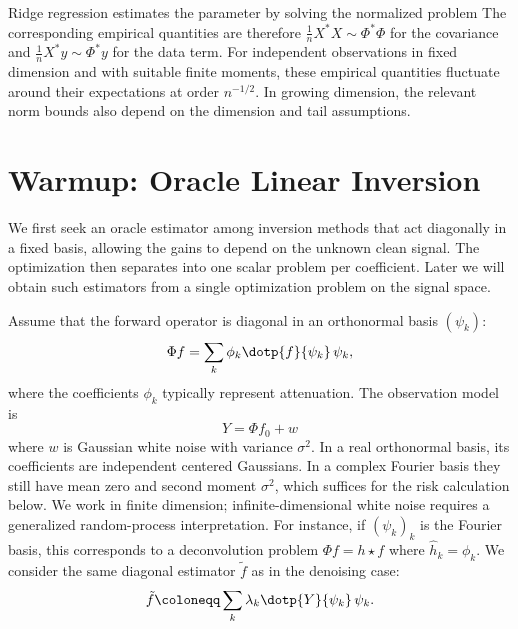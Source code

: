 Ridge regression estimates the parameter by solving the normalized problem
The corresponding empirical quantities are therefore $\frac{1}{n}X^*X \sim \Phi^*\Phi$ for the covariance and $\frac{1}{n}X^*y \sim \Phi^*y$ for the data term.
%
For independent observations in fixed dimension and with suitable finite moments, these empirical quantities fluctuate around their expectations at order $n^{-1/2}$. In growing dimension, the relevant norm bounds also depend on the dimension and tail assumptions.

 
\section{Warmup: Oracle Linear Inversion}

We first seek an oracle estimator among inversion methods that act diagonally in a fixed basis, allowing the gains to depend on the unknown clean signal. The optimization then separates into one scalar problem per coefficient. Later we will obtain such estimators from a single optimization problem on the signal space.

Assume that the forward operator is diagonal in an orthonormal basis $(\psi_k)$:
$$
	\Phi f = \sum_k \phi_k \dotp{f}{\psi_k} \, \psi_k,
$$
where the coefficients $\phi_k$ typically represent attenuation.
%
The observation model is
$$
	Y = \Phi f_0 + w
$$
where $w$ is Gaussian white noise with variance $\sigma^2$. In a real orthonormal basis, its coefficients are independent centered Gaussians. In a complex Fourier basis they still have mean zero and second moment $\sigma^2$, which suffices for the risk calculation below. We work in finite dimension; infinite-dimensional white noise requires a generalized random-process interpretation.
%
For instance, if $(\psi_k)_k$ is the Fourier basis, this corresponds to a deconvolution problem $\Phi f = h \star f$ where $\hat h_k = \phi_k$. We consider the same diagonal estimator $\tilde{f}$ as in the denoising case:
$$
	\tilde{f} \coloneqq \sum_k \lambda_k \dotp{Y}{\psi_k} \, \psi_k.
$$


